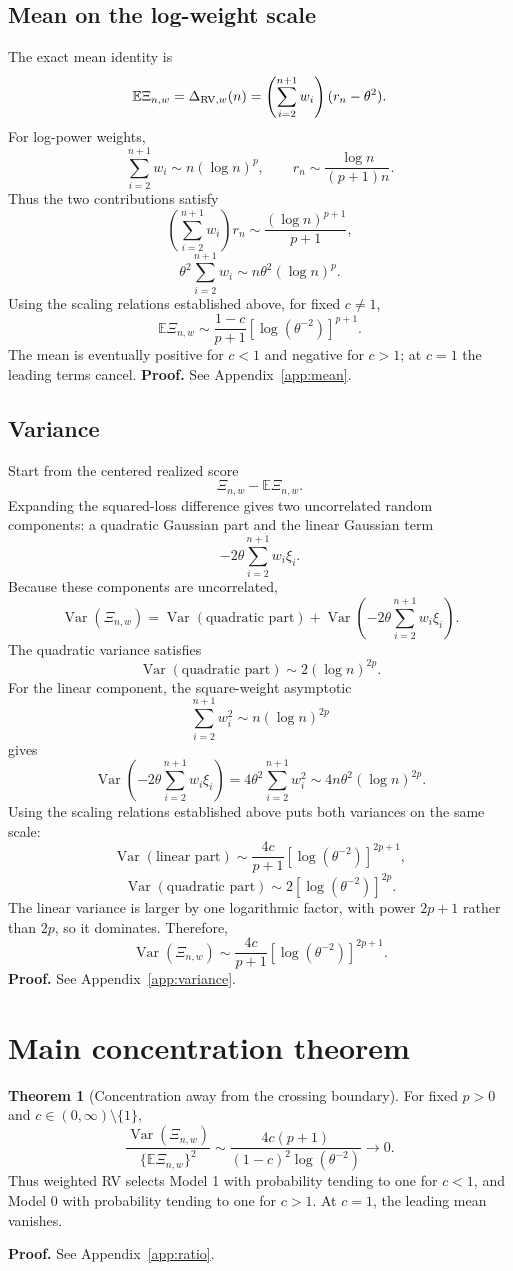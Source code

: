 \documentclass[11pt]{article}
\theoremstyle{definition}
\newtheorem{theorem}{Theorem}[section]
\begin{document}
\subsection{Mean on the log-weight scale}
The exact mean identity is
\[
\mathbb E\Xi_{n,w}
=\Delta_{{\rm RV},w}(n)
=\left(\sum_{i=2}^{n+1}w_i\right)(r_n-\theta^2).
\]
For log-power weights,
\[
\sum_{i=2}^{n+1}w_i\sim n(\log n)^p,\qquad
r_n\sim\frac{\log n}{(p+1)n}.
\]
Thus the two contributions satisfy
\[
\left(\sum_{i=2}^{n+1}w_i\right)r_n
\sim\frac{(\log n)^{p+1}}{p+1},
\]
\[
\theta^2\sum_{i=2}^{n+1}w_i\sim n\theta^2(\log n)^p.
\]
Using the scaling relations established above, for fixed $c\ne1$,
\[
\mathbb E\Xi_{n,w}\sim
\frac{1-c}{p+1}[\log(\theta^{-2})]^{p+1}.
\]
The mean is eventually positive for $c<1$ and negative for
$c>1$; at $c=1$ the leading terms cancel.
\textbf{Proof.} See Appendix~\ref{app:mean}.

\subsection{Variance}
Start from the centered realized score
\[
\Xi_{n,w}-\mathbb E\Xi_{n,w}.
\]
Expanding the squared-loss difference gives two uncorrelated random
components: a quadratic Gaussian part and the linear Gaussian term
\[
-2\theta\sum_{i=2}^{n+1}w_i\xi_i.
\]
Because these components are uncorrelated,
\[
\operatorname{Var}(\Xi_{n,w})
=\operatorname{Var}(\text{quadratic part})
+\operatorname{Var}\!\left(-2\theta\sum_{i=2}^{n+1}w_i\xi_i\right).
\]
The quadratic variance satisfies
\[
\operatorname{Var}(\text{quadratic part})\sim2(\log n)^{2p}.
\]
For the linear component, the square-weight asymptotic
\[
\sum_{i=2}^{n+1}w_i^2\sim n(\log n)^{2p}
\]
gives
\[
\operatorname{Var}\!\left(-2\theta\sum_{i=2}^{n+1}w_i\xi_i\right)
=4\theta^2\sum_{i=2}^{n+1}w_i^2
\sim4n\theta^2(\log n)^{2p}.
\]
Using the scaling relations established above puts both variances
on the same scale:
\[
\operatorname{Var}(\text{linear part})
\sim\frac{4c}{p+1}[\log(\theta^{-2})]^{2p+1},
\]
\[
\operatorname{Var}(\text{quadratic part})
\sim2[\log(\theta^{-2})]^{2p}.
\]
The linear variance is larger by one logarithmic factor, with power
$2p+1$ rather than $2p$, so it dominates. Therefore,
\[
\operatorname{Var}(\Xi_{n,w})
\sim\frac{4c}{p+1}[\log(\theta^{-2})]^{2p+1}.
\]
\textbf{Proof.} See Appendix~\ref{app:variance}.

\section{Main concentration theorem}
\begin{theorem}[Concentration away from the crossing boundary]
For fixed $p>0$ and $c\in(0,\infty)\setminus\{1\}$,
\[
\frac{\operatorname{Var}(\Xi_{n,w})}{\{\mathbb E\Xi_{n,w}\}^2}
\sim\frac{4c(p+1)}{(1-c)^2\log(\theta^{-2})}\to0.
\]
Thus weighted RV selects Model 1 with probability tending to one for
$c<1$, and Model 0 with probability tending to one for $c>1$.
At $c=1$, the leading mean vanishes.
\end{theorem}
\noindent\textbf{Proof.} See Appendix~\ref{app:ratio}.
\end{document}
